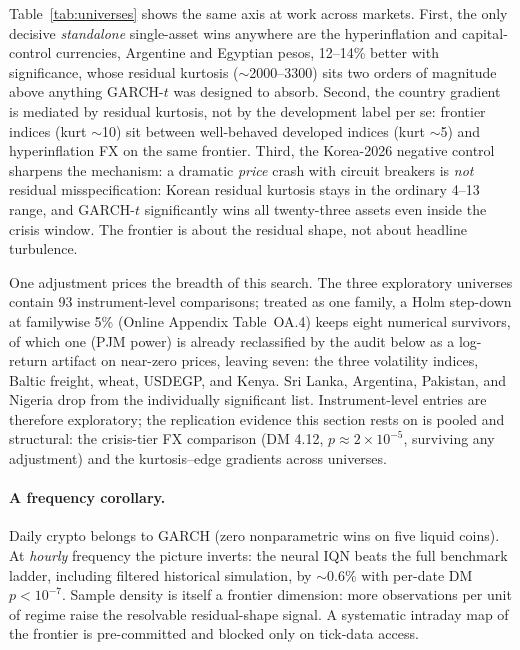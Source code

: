 \documentclass[11pt]{article}
\theoremstyle{remark}
\begin{document}
Table~\ref{tab:universes} shows the same axis at work across markets.
First, the only decisive
\emph{standalone} single-asset wins anywhere are the hyperinflation and capital-control currencies, Argentine and Egyptian pesos, 12--14\%
better with significance, whose residual kurtosis ($\sim$2000--3300)
sits two orders of magnitude above anything GARCH-$t$ was designed to
absorb. Second, the country gradient is mediated by residual kurtosis,
not by the development label per se: frontier indices (kurt $\sim$10)
sit between well-behaved developed indices (kurt $\sim$5) and
hyperinflation FX on the same frontier. Third, the Korea-2026 negative
control sharpens the mechanism: a dramatic \emph{price} crash with
circuit breakers is \emph{not} residual misspecification: Korean residual kurtosis stays in the ordinary 4--13 range, and GARCH-$t$
significantly wins all twenty-three assets even inside the crisis
window. The frontier is about the residual shape, not about headline
turbulence.

One adjustment prices the breadth of this search. The three
exploratory universes contain 93 instrument-level comparisons; treated
as one family, a Holm step-down at familywise 5\% (Online Appendix
Table~OA.4) keeps eight numerical survivors, of which one (PJM power)
is already reclassified by the audit below as a log-return artifact on
near-zero prices, leaving seven: the three volatility indices, Baltic
freight, wheat, USDEGP, and Kenya. Sri Lanka, Argentina, Pakistan, and
Nigeria drop from the individually significant list. Instrument-level
entries are therefore exploratory; the replication evidence this
section rests on is pooled and structural: the crisis-tier FX
comparison (DM 4.12, $p\approx2\times10^{-5}$, surviving any
adjustment) and the kurtosis--edge gradients across universes.

\paragraph{A frequency corollary.} Daily crypto belongs to GARCH (zero
nonparametric wins on five liquid coins). At \emph{hourly} frequency the
picture inverts: the neural IQN beats the full benchmark ladder,
including filtered historical simulation, by $\sim$0.6\% with per-date
DM $p < 10^{-7}$. Sample density is itself a frontier dimension: more
observations per unit of regime raise the resolvable residual-shape
signal. A systematic intraday map of the frontier is pre-committed and
blocked only on tick-data access.
\end{document}

